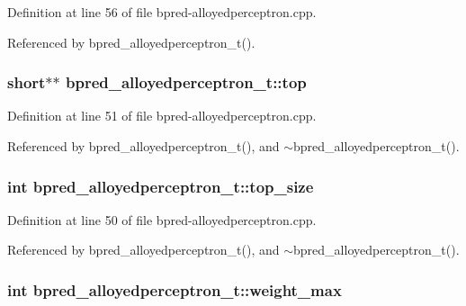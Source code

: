 Definition at line 56 of file bpred-alloyedperceptron.cpp.

Referenced by bpred\_\-alloyedperceptron\_\-t().
\subsubsection[{top}]{\setlength{\rightskip}{0pt plus 5cm}short$\ast$$\ast$ {\bf bpred\_\-alloyedperceptron\_\-t::top}\hspace{0.3cm}{\tt  [protected]}}\label{classbpred__alloyedperceptron__t_caf6bb6799be2fe01ad9761a5bbc2f54}




Definition at line 51 of file bpred-alloyedperceptron.cpp.

Referenced by bpred\_\-alloyedperceptron\_\-t(), and $\sim$bpred\_\-alloyedperceptron\_\-t().
\subsubsection[{top\_\-size}]{\setlength{\rightskip}{0pt plus 5cm}int {\bf bpred\_\-alloyedperceptron\_\-t::top\_\-size}\hspace{0.3cm}{\tt  [protected]}}\label{classbpred__alloyedperceptron__t_4988e806ded4559c8bbad3082d8aeb0d}




Definition at line 50 of file bpred-alloyedperceptron.cpp.

Referenced by bpred\_\-alloyedperceptron\_\-t(), and $\sim$bpred\_\-alloyedperceptron\_\-t().
\subsubsection[{weight\_\-max}]{\setlength{\rightskip}{0pt plus 5cm}int {\bf bpred\_\-alloyedperceptron\_\-t::weight\_\-max}\hspace{0.3cm}{\tt  [protected]}}\label{classbpred__alloyedperceptron__t_915bb35a9a7065b1e2af511a2d54fdb2}




